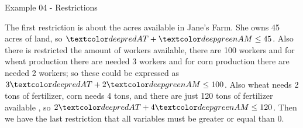 \begin{frame}{Example 04 - Restrictions}

The first restriction is about the acres available in Jane's Farm. She owns
45 acres of land, so $\colora{AT} +  \colorb{AM} \le 45$. Also there is
restricted the amount of workers available, there are 100 workers and for
wheat production there are needed 3 workers and for corn production
there are needed 2 workers; so these could be expressed as $3\colora{AT} + 2\colorb{AM} \le 100$.
Also wheat needs 2 tons of fertilizer, corn needs 4 tons, and there are just
120 tons of fertilizer available , so $2\colora{AT} + 4\colorb{AM} \le 120$.
Then we have the last restriction that all variables must be greater or equal
than 0.
\end{frame}
